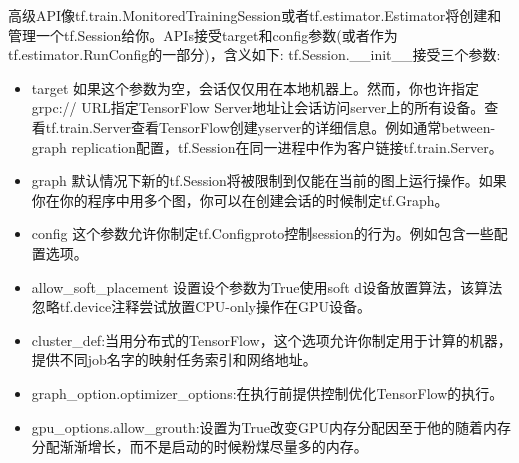 高级API像tf.train.MonitoredTrainingSession或者tf.estimator.Estimator将创建和管理一个tf.Session给你。APIs接受target和config参数(或者作为tf.estimator.RunConfig的一部分)，含义如下:
tf.Session.\_\_init\_\_接受三个参数:
\begin{itemize}
	\item target 如果这个参数为空，会话仅仅用在本地机器上。然而，你也许指定grpc:// URL指定TensorFlow Server地址让会话访问server上的所有设备。查看tf.train.Server查看TensorFlow创建yserver的详细信息。例如通常between-graph replication配置，tf.Session在同一进程中作为客户链接tf.train.Server。
	\item graph 默认情况下新的tf.Session将被限制到仅能在当前的图上运行操作。如果你在你的程序中用多个图，你可以在创建会话的时候制定tf.Graph。
	\item config 这个参数允许你制定tf.Configproto控制session的行为。例如包含一些配置选项。
	\item allow\_soft\_placement 设置设个参数为True使用soft d设备放置算法，该算法忽略tf.device注释尝试放置CPU-only操作在GPU设备。
	\item cluster\_def:当用分布式的TensorFlow，这个选项允许你制定用于计算的机器，提供不同job名字的映射任务索引和网络地址。
	\item graph\_option.optimizer\_options:在执行前提供控制优化TensorFlow的执行。
	\item gpu\_options.allow\_grouth:设置为True改变GPU内存分配因至于他的随着内存分配渐渐增长，而不是启动的时候粉煤尽量多的内存。
\end{itemize}
